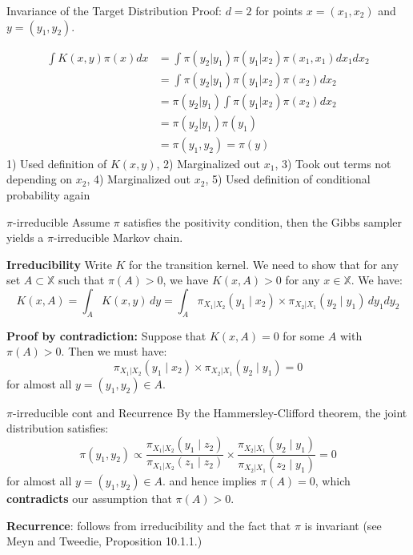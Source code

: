 \begin{frame}{Invariance of the Target Distribution }
	Proof: $d=2$ for points $x=(x_1,x_2)$ and $y=(y_1,y_2)$.

	\begin{align}
		\int K(x,y) \pi(x)dx & = \int \pi(y_2 | y_1)\pi(y_1 | x_2)\pi(x_1, x_1)dx_1 dx_2 \\
		                     & = \int \pi(y_2 | y_1)\pi(y_1 | x_2)\pi(x_2)dx_2           \\
		                     & = \pi(y_2 | y_1) \int \pi(y_1 | x_2)\pi(x_2)dx_2          \\
		                     & = \pi(y_2 | y_1)\pi(y_1)                                  \\
		                     & = \pi(y_1, y_2) = \pi(y)
	\end{align}
	1) Used definition of $K(x,y)$, 2) Marginalized out $x_1$,
	3) Took out terms not depending on $x_2$, 4) Marginalized out $x_2$,
	5) Used definition of conditional probability again
\end{frame}

\begin{frame}{$\pi$-irreducible}
	Assume $\pi$ satisfies the positivity condition, then the Gibbs sampler
	yields a $\pi$-irreducible Markov chain.

	\textbf{Irreducibility} Write $K$ for the transition kernel. We need to show that for
	any set $A \subset \mathbb{X}$ such that $\pi(A) > 0$, we have $K(x, A) > 0$ for
	any $x \in \mathbb{X}$. We have:
	\begin{equation*}
		K(x, A) = \int_A K(x, y)\,dy = \int_A \pi_{X_1|X_2}(y_1 \mid x_2) \times \pi_{X_2|X_1}(y_2 \mid y_1)\,dy_1dy_2
	\end{equation*}

	\textbf{Proof by contradiction:} Suppose that $K(x, A) = 0$ for some $A$ with $\pi(A) > 0$.
	Then we must have:
	\begin{equation*}
		\pi_{X_1|X_2}(y_1 \mid x_2) \times \pi_{X_2|X_1}(y_2 \mid y_1) = 0
	\end{equation*}
	for almost all $y = (y_1, y_2) \in A$.
\end{frame}

\begin{frame}{$\pi$-irreducible cont and Recurrence}
	By the Hammersley-Clifford theorem, the joint distribution satisfies:
	\begin{equation*}
		\pi(y_1, y_2) \propto \frac{\pi_{X_1|X_2}(y_1 \mid z_2)}{\pi_{X_1|X_2}(z_1 \mid z_2)} \times \frac{\pi_{X_2|X_1}(y_2 \mid y_1)}{\pi_{X_2|X_1}(z_2 \mid y_1)} = 0
	\end{equation*}
	for almost all $y = (y_1, y_2) \in A$.
	and hence implies $\pi(A) = 0$, which \textbf{contradicts} our assumption that $\pi(A) > 0$.

	\vspace{0.5cm}
	\textbf{Recurrence}: follows from irreducibility and the fact that $\pi$ is
	invariant (see Meyn and Tweedie, Proposition 10.1.1.)
\end{frame}

